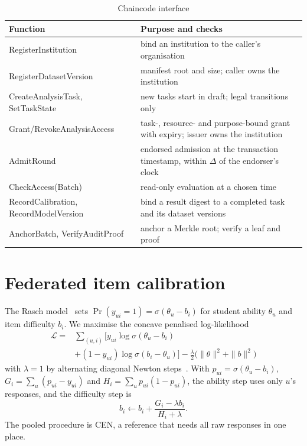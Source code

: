 \documentclass[pdflatex,iicol,sn-mathphys-num]{sn-jnl}
\theoremstyle{thmstyleone}
\begin{document}
\begin{table}[t]
\centering
\caption{Chaincode interface}
\label{tab:chaincode}
\footnotesize
\begin{tabular}{@{}p{}p{}@{}}
\toprule
Function & Purpose and checks \\
\midrule
RegisterInstitution & bind an institution to the caller's organisation \\
Register\-Dataset\-Version & manifest root and size; caller owns the institution \\
CreateAnalysisTask, SetTaskState & new tasks start in draft; legal transitions only \\
Grant/Revoke\-Analysis\-Access & task-, resource- and purpose-bound grant with expiry; issuer owns the institution \\
AdmitRound & endorsed admission at the transaction timestamp, within $\Delta$ of the endorser's clock \\
CheckAccess(Batch) & read-only evaluation at a chosen time \\
RecordCalibration, RecordModelVersion & bind a result digest to a completed task and its dataset versions \\
AnchorBatch, VerifyAuditProof & anchor a Merkle root; verify a leaf and proof \\
\bottomrule
\end{tabular}
\end{table}

\section{Federated item calibration}\label{sec:calibration}

The Rasch model~\cite{rasch1960probabilistic} sets $\Pr(y_{ui}=1)=\sigma(\theta_u-b_i)$ for student ability $\theta_u$ and item difficulty $b_i$. We maximise the concave penalised log-likelihood
\begin{equation}\label{eq:obj}
\begin{aligned}
\mathcal{L}={}&\textstyle\sum_{(u,i)}\big[y_{ui}\log\sigma(\theta_u-b_i)\\
&+(1-y_{ui})\log\sigma(b_i-\theta_u)\big]-\tfrac{\lambda}{2}\big(\|\theta\|^2+\|b\|^2\big)
\end{aligned}
\end{equation}
with $\lambda=1$ by alternating diagonal Newton steps~\cite{baker2004item}. With $p_{ui}=\sigma(\theta_u-b_i)$, $G_i=\sum_u (p_{ui}-y_{ui})$ and $H_i=\sum_u p_{ui}(1-p_{ui})$, the ability step uses only $u$'s responses, and the difficulty step is
\begin{equation}\label{eq:bstep}
b_i\leftarrow b_i+\frac{G_i-\lambda b_i}{H_i+\lambda}.
\end{equation}
The pooled procedure is CEN, a reference that needs all raw responses in one place.
\end{document}
